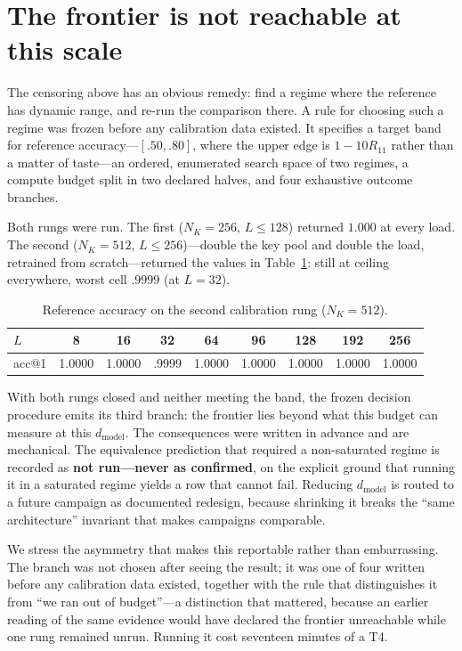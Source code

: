 \documentclass{article}
\begin{document}
\section{The frontier is not reachable at this scale}

The censoring above has an obvious remedy: find a regime where the reference has dynamic range,
and re-run the comparison there. A rule for choosing such a regime was frozen before any
calibration data existed. It specifies a target band for reference accuracy---$[.50, .80]$,
where the upper edge is $1-10R_{11}$ rather than a matter of taste---an ordered, enumerated
search space of two regimes, a compute budget split in two declared halves, and four exhaustive
outcome branches.

Both rungs were run. The first ($N_K=256$, $L\le128$) returned $1.000$ at every load. The
second ($N_K=512$, $L\le256$)---double the key pool and double the load, retrained from
scratch---returned the values in Table~\ref{tab:rungs}: still at ceiling everywhere, worst cell
$.9999$ (at $L=32$).

\begin{table}[htbp]
\centering
\caption{Reference accuracy on the second calibration rung ($N_K=512$).}
\label{tab:rungs}
\begin{tabular}{lcccccccc}
\toprule
$L$ & 8 & 16 & 32 & 64 & 96 & 128 & 192 & 256 \\
\midrule
acc@1 & 1.0000 & 1.0000 & .9999 & 1.0000 & 1.0000 & 1.0000 & 1.0000 & 1.0000 \\
\bottomrule
\end{tabular}
\end{table}

With both rungs closed and neither meeting the band, the frozen decision procedure emits its
third branch: the frontier lies beyond what this budget can measure at this $d_{\text{model}}$.
The consequences were written in advance and are mechanical. The equivalence prediction that
required a non-saturated regime is recorded as \textbf{not run---never as confirmed}, on the
explicit ground that running it in a saturated regime yields a row that cannot fail. Reducing
$d_{\text{model}}$ is routed to a future campaign as documented redesign, because shrinking it
breaks the ``same architecture'' invariant that makes campaigns comparable.

We stress the asymmetry that makes this reportable rather than embarrassing. The branch was not
chosen after seeing the result; it was one of four written before any calibration data existed,
together with the rule that distinguishes it from ``we ran out of budget''---a distinction that
mattered, because an earlier reading of the same evidence would have declared the frontier
unreachable while one rung remained unrun. Running it cost seventeen minutes of a T4.
\end{document}
